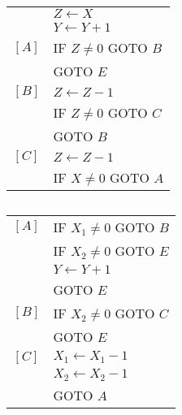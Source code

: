\subsection{}
\begin{center}
\begin{tabular}{ll}
        & $ Z \gets X $ \\
        & $ Y \gets Y + 1 $ \\
  $[A]$ & IF $Z \neq 0$ GOTO $B$ \\
        & GOTO $E$ \\
  $[B]$ & $ Z \gets Z - 1 $ \\
        & IF $Z \neq 0$ GOTO $C$ \\
        & GOTO $B$ \\
  $[C]$ & $ Z \gets Z - 1 $ \\
        & IF $X \neq 0$ GOTO $A$ \\
\end{tabular}
\end{center}

\subsection{}
\begin{center}
\begin{tabular}{ll}
  $[A]$ & IF $X_{1} \neq 0$ GOTO $B$ \\
        & IF $X_{2} \neq 0$ GOTO $E$ \\
        & $ Y \gets Y + 1 $ \\
        & GOTO $E$ \\
  $[B]$ & IF $X_{2} \neq 0$ GOTO $C$ \\
        & GOTO $E$ \\
  $[C]$ & $ X_{1} \gets X_{1} - 1 $ \\
        & $ X_{2} \gets X_{2} - 1 $ \\
        & GOTO $A$ \\
\end{tabular}
\end{center}


